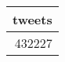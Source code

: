 \begin{table}[ht]
\centering
\begin{tabular}{r}
  \hline
tweets \\ 
  \hline
432227 \\ 
   \hline
\end{tabular}
\end{table}
